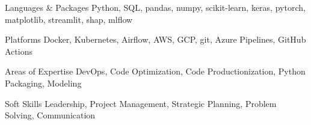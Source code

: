 
\begin{cvskills}

  \cvskill
    {Languages \& Packages} %
    {Python, SQL, pandas, numpy, scikit-learn, keras, pytorch, matplotlib, streamlit, shap, mlflow} %

  \cvskill
    {Platforms} %
    {Docker, Kubernetes, Airflow, AWS, GCP, git, Azure Pipelines, GitHub Actions} %

  \cvskill
    {Areas of Expertise}
    {DevOps, Code Optimization, Code Productionization, Python Packaging, Modeling}

  \cvskill
    {Soft Skills}
    {Leadership, Project Management, Strategic Planning, Problem Solving, Communication}

\end{cvskills}